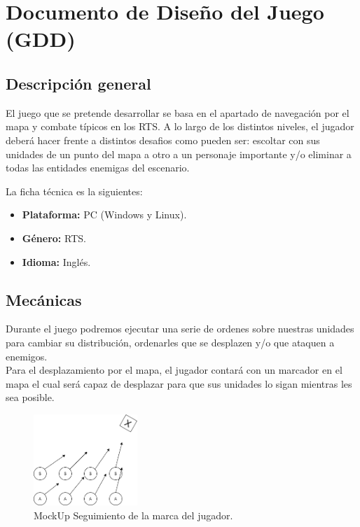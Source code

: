 \chapter{Documento de Diseño del Juego (GDD)}
\label{GDD}

\section{Descripción general}
El juego que se pretende desarrollar se basa en el apartado de navegación por el mapa y combate
típicos en los \ac{RTS}. A lo largo de los distintos niveles, el jugador deberá hacer
frente a distintos desafios como pueden ser: escoltar con sus unidades de un punto
del mapa a otro a un personaje importante y/o eliminar a todas las entidades enemigas del escenario.

La ficha técnica es la siguientes:

\begin{itemize}
	\item \textbf{Plataforma:} \ac{PC} (Windows y Linux).
	\item \textbf{Género:} \acf{RTS}.
	\item \textbf{Idioma:} Inglés.
\end{itemize}

\section{Mecánicas}
Durante el juego podremos ejecutar una serie de ordenes sobre nuestras unidades para cambiar
su distribución, ordenarles que se desplazen y/o que ataquen a enemigos.\\
Para el desplazamiento por el mapa, el jugador contará con un marcador en el mapa el cual
será capaz de desplazar para que sus unidades lo sigan mientras les sea posible.

\begin{figure}[ht]
\centering
\includegraphics[width=0.35\textwidth]{imagenes/gdd/Following.png}
\caption{MockUp Seguimiento de la marca del jugador.}
\label{fig:mockup_following}
\end{figure}

